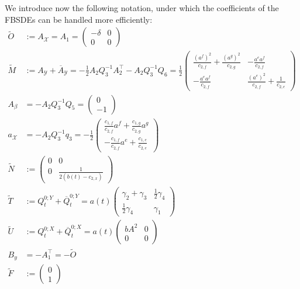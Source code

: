 \documentclass[11pt,twoside]{amsart}
\theoremstyle{definition}
\numberwithin{equation}{section}
\renewcommand{\tilde}{\widetilde}
\begin{document}
We introduce now the following notation, under which the coefficients of the FBSDEs can be handled more efficiently: 
\begin{align*}
\tilde{O}&:= A_{\mathcal{X}}= A_1 
= \begin{pmatrix}
    -\delta & 0\\
    0 & 0
\end{pmatrix}\\
\tilde{M}& := A_\mathcal{Y}+\overline{A}_\mathcal{Y} = -\frac{1}{2} A_2 Q_3^{-1} A_2^\top  - A_2 Q_3^{-1} Q_6 
= \frac{1}{2} \begin{pmatrix} 
\frac{(a^f)^2}{c_{2,f}}+\frac{(a^g)^2}{c_{2,g}}		&-\frac{a^e a^f}{c_{2,f}}\\
-\frac{a^e a^f}{c_{2,f}}	&\frac{(a^e)^2}{c_{2,f}} +\frac{1}{c_{2,e}}	
\end{pmatrix}
\\
A_\beta &= -A_2 Q_3^{-1} Q_5 
= \begin{pmatrix} 
0 \\
- 1	
\end{pmatrix}
\\
    a_\mathcal{X} &= -A_2 Q_3^{-1}q_3
    = -\frac{1}{2}\begin{pmatrix} 
\frac{c_{1,f}}{c_{2,f}}a^{f} + \frac{c_{1,g}}{c_{2,g}}a^{g} \\
-\frac{c_{1,f}}{c_{2,f}}a^{e} + \frac{c_{1,e}}{c_{2,e}}
\end{pmatrix}
\\
\tilde{N} 
& := \begin{pmatrix}
    0 & 0 \\
    0 & \frac{1}{2 (b(t)-c_{2,x})}
\end{pmatrix}
\\
 \tilde{T}&:= Q^{0;Y}_t + \overline{Q}^{0;Y}_t= a(t) \begin{pmatrix}
\gamma_2+\gamma_3&\frac{1}{2} \gamma_4 \\ \frac{1}{2}\gamma_4 &\gamma_1\end{pmatrix}
\\
\tilde{U}&:= Q^{0;X}_t + \overline{Q}^{0;X}_t
= a(t) \begin{pmatrix}
bA^2&0\\
0&0
\end{pmatrix}
\\
B_y &= -A_1^\top  = - \widetilde{O}
\\
\widetilde{F} 
& :=
\begin{pmatrix}
    0\\
    1
\end{pmatrix}
\end{align*}
\end{document}
